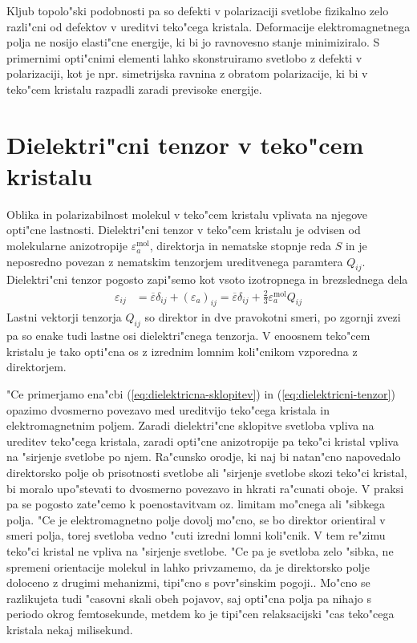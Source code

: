 \documentclass[12pt,twoside,openright,final,a4paper]{report}
\begin{document}
Kljub topolo"ski podobnosti pa so defekti v polarizaciji svetlobe fizikalno zelo razli"cni od defektov v ureditvi teko"cega kristala. 
Deformacije elektromagnetnega polja ne nosijo elasti"cne energije, ki bi jo ravnovesno stanje minimiziralo. 
S primernimi opti"cnimi elementi lahko skonstruiramo svetlobo z defekti v polarizaciji, kot je npr. simetrijska ravnina z obratom polarizacije, ki bi v teko"cem kristalu razpadli zaradi previsoke energije. 

\section{Dielektri"cni tenzor v teko"cem kristalu}
\label{sec:dielektricnost}
Oblika in polarizabilnost molekul v teko"cem kristalu vplivata na njegove opti"cne lastnosti. 
Dielektri"cni tenzor v teko"cem kristalu je odvisen od molekularne anizotropije $\varepsilon_{a}^{\mathrm{mol}}$, direktorja in nematske stopnje reda $S$ in je neposredno povezan z nematskim tenzorjem ureditvenega paramtera $Q_{ij}$.
Dielektri"cni tenzor pogosto zapi"semo kot vsoto izotropnega in brezslednega dela \cite{degennes, ravnik-zumer-ldg}
\begin{align}
\label{eq:dielektricni-tenzor}
 \varepsilon_{ij} &= \overline\varepsilon \delta_{ij} + (\varepsilon_a)_{ij} = \overline\varepsilon\delta_{ij} + \frac{2}{3}\varepsilon_a^{\mathrm{mol}} Q_{ij}
\end{align}
Lastni vektorji tenzorja $Q_{ij}$ so direktor in dve pravokotni smeri, po zgornji zvezi pa so enake tudi lastne osi dielektri"cnega tenzorja. 
V enoosnem teko"cem kristalu je tako opti"cna os z izrednim lomnim koli"cnikom vzporedna z direktorjem. 

"Ce primerjamo ena"cbi (\ref{eq:dielektricna-sklopitev}) in (\ref{eq:dielektricni-tenzor}) opazimo dvosmerno povezavo med ureditvijo teko"cega kristala in elektromagnetnim poljem. 
Zaradi dielektri"cne sklopitve svetloba vpliva na ureditev teko"cega kristala, zaradi opti"cne anizotropije pa teko"ci kristal vpliva na "sirjenje svetlobe po njem. 
Ra"cunsko orodje, ki naj bi natan"cno napovedalo direktorsko polje ob prisotnosti svetlobe ali "sirjenje svetlobe skozi teko"ci kristal, bi moralo upo"stevati to dvosmerno povezavo in hkrati ra"cunati oboje. 
V praksi pa se pogosto zate"cemo k poenostavitvam oz. limitam mo"cnega ali "sibkega polja. 
"Ce je elektromagnetno polje dovolj mo"cno, se bo direktor orientiral v smeri polja, torej svetloba vedno "cuti izredni lomni koli"cnik. 
V tem re"zimu teko"ci kristal ne vpliva na "sirjenje svetlobe. 
"Ce pa je svetloba zelo "sibka, ne spremeni orientacije molekul in lahko privzamemo, da je direktorsko polje doloceno z drugimi mehanizmi, tipi"cno s povr"sinskim pogoji.. 
Mo"cno se razlikujeta tudi "casovni skali obeh pojavov, saj opti"cna polja pa nihajo s periodo okrog femtosekunde, metdem ko je tipi"cen relaksacijski "cas teko"cega kristala nekaj milisekund. 
\end{document}
